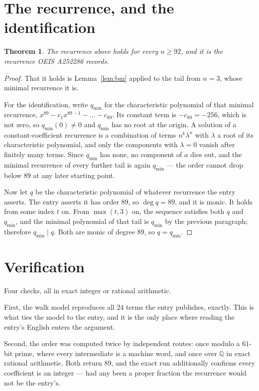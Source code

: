 \documentclass[11pt,a4paper]{article}
\theoremstyle{plain}
\newtheorem{theorem}{Theorem}
\theoremstyle{definition}
\begin{document}
\section{The recurrence, and the identification}

\begin{theorem}
The recurrence above holds for every $n\ge92$, and it is the recurrence OEIS A252286 records.
\end{theorem}

\begin{proof}
That it holds is Lemma~\ref{lem:bm} applied to the tail from $n=3$, whose minimal
recurrence it is.

For the identification, write $q_{\min}$ for the characteristic polynomial of that minimal
recurrence, $x^{89}-c_1x^{89-1}-\dots-c_{89}$. Its constant term is
$-c_{89}=-256$, which is not zero, so $q_{\min}(0)\neq0$ and $q_{\min}$ has no
root at the origin. A solution of a constant-coefficient recurrence is a combination of terms
$n^{k}\lambda^{n}$ with $\lambda$ a root of its characteristic polynomial, and only the
components with $\lambda=0$ vanish after finitely many terms. Since $q_{\min}$ has none, no
component of $a$ dies out, and the minimal recurrence of every further tail is again
$q_{\min}$ --- the order cannot drop below $89$ at any later starting point.

Now let $q$ be the characteristic polynomial of whatever recurrence the entry asserts. The
entry asserts it has order $89$, so $\deg q=89$, and it is monic. It holds from some
index $t$ on. From $\max(t,3)$ on, the sequence satisfies both $q$ and $q_{\min}$, and
the minimal polynomial of that tail is $q_{\min}$ by the previous paragraph; therefore
$q_{\min}\mid q$. Both are monic of degree $89$, so $q=q_{\min}$.
\end{proof}

\section{Verification}

Four checks, all in exact integer or rational arithmetic.

First, the walk model reproduces all $24$ terms the entry publishes, exactly. This is
what ties the model to the entry, and it is the only place where reading the entry's English
enters the argument.

Second, the order was computed twice by independent routes: once modulo a $61$-bit prime, where
every intermediate is a machine word, and once over $\mathbb{Q}$ in exact rational arithmetic.
Both return $89$, and the exact run additionally confirms every coefficient is an integer
--- had any been a proper fraction the recurrence would not be the entry's.
\end{document}

